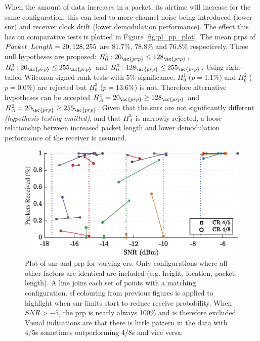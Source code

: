 When the amount of data increases in a packet, its airtime will increase for the same configuration; this can lead to more channel noise being introduced (lower \ac{snr}) and receiver clock drift (lower demodulation performance). The effect this has on comparative tests is plotted in Figure \ref{fig:pl_pp_plot}. The mean \ac{prp}s of $Packet\enskip Length = 20, 128, 255$ are $81.7\%$, $78.8\%$ and $76.8\%$ respectively.  Three null hypotheses are proposed: $H^1_{0} : 20_{\ac{prp}} \leq 128_{\ac{prp}}$, $H^2_{0} : 20_{\ac{prp}} \leq 255_{\ac{prp}}$ and $H^3_{0} : 128_{\ac{prp}} \leq 255_{\ac{prp}}$. Using right-tailed Wilcoxon signed rank tests with 5\% significance, $H^1_{0}$ ($p=1.1\%$) and $H^2_{0}$ ($p=0.0\%$) are rejected but $H^3_{0}$ ($p=13.6\%$) is not. Therefore alternative hypotheses can be accepted  $H^1_{A}=20_{\ac{prp}} \geq 128_{\ac{prp}}$ and $H^2_{A}=20_{\ac{prp}} \geq 255_{\ac{prp}}$. Given that the \ac{snr}s are not significantly different \textit{(hypothesis testing omitted)}, and that $H^3_{A}$ is narrowly rejected, a loose relationship between increased packet length and lower demodulation performance of the receiver is assumed.


\begin{figure}[H]
    \centering
   	\includegraphics{Figures/cr_pp_plot}
    \caption[Effect of Coding Rate on \ac{snr} and \ac{prp}]{
    Plot of \ac{snr} and \ac{prp} for varying \ac{cr}s. Only configurations where all other factors are identical are included (e.g. height, location, packet length). A line joins each set of points with a matching configuration. \ac{sf} colouring from previous figures is applied to highlight when \ac{snr} limits start to reduce receive probability. When $SNR > -5$, the \ac{prp} is nearly always 100\% and is therefore excluded. Visual indications are that there is little pattern in the data with 4/5s sometimes outperforming 4/8s and vice versa.
    }
    \label{fig:cr_pp_plot}
\end{figure}


